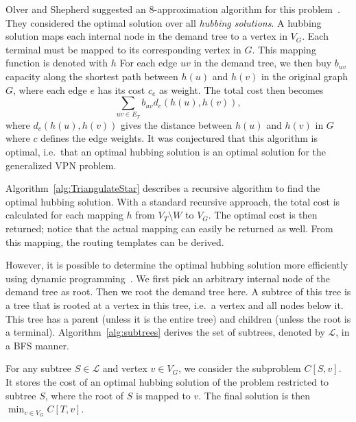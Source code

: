 Olver and Shepherd suggested an 8-approximation algorithm for this problem~\cite{olver2010approxrnd}.
They considered the optimal solution over all \emph{hubbing solutions}.
A hubbing solution maps each internal node in the demand tree to a vertex in $V_G$.
Each terminal must be mapped to its corresponding vertex in $G$.
This mapping function is denoted with $h$
For each edge $uv$ in the demand tree, we then buy $b_{uv}$ capacity along the shortest path between $h(u)$ and $h(v)$ in the original graph $G$, where each edge $e$ has its cost $c_e$ as weight.
The total cost then becomes
\[
    \sum_{uv \in E_T} b_{uv} d_c(h(u), h(v)),
\]
where $d_c(h(u), h(v))$ gives the distance between $h(u)$ and $h(v)$ in $G$ where $c$ defines the edge weights.
It was conjectured that this algorithm is optimal, i.e.\ that an optimal hubbing solution is an optimal solution for the generalized VPN problem.

Algorithm~\ref{alg:TriangulateStar} describes a recursive algorithm to find the optimal hubbing solution.
With a standard recursive approach, the total cost is calculated for each mapping $h$ from $V_T \setminus W$ to $V_G$.
The optimal cost is then returned; notice that the actual mapping can easily be returned as well.
From this mapping, the routing templates can be derived.

However, it is possible to determine the optimal hubbing solution more efficiently using dynamic programming~\cite{olver2010approxrnd}.
We first pick an arbitrary internal node of the demand tree as root.
Then we root the demand tree here.
A subtree of this tree is a tree that is rooted at a vertex in this tree, i.e.\ a vertex and all nodes below it.
This tree has a parent (unless it is the entire tree) and children (unless the root is a terminal).
Algorithm~\ref{alg:subtrees} derives the set of subtrees, denoted by $\mathcal L$, in a BFS manner.

For any subtree $S \in \mathcal L$ and vertex $v \in V_G$, we consider the subproblem $C[S, v]$.
It stores the cost of an optimal hubbing solution of the problem restricted to subtree $S$, where the root of $S$ is mapped to $v$.
The final solution is then $\min_{v \in V_G} C[T, v]$.


